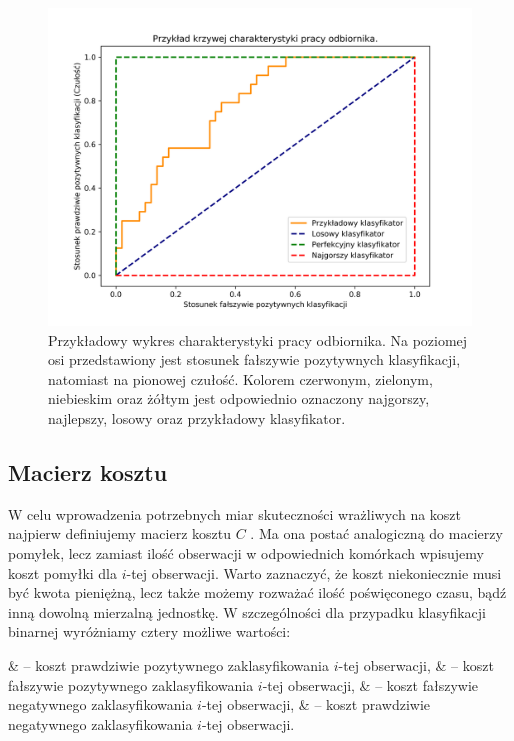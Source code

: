 \documentclass[inzynierska]{pwr_wmat_praca_dyplomowa}
\theoremstyle{plain}
\numberwithin{theorem}{chapter}
\theoremstyle{definition}
\numberwithin{theorem}{chapter}
\begin{document}
\begin{figure}[h]
	\includegraphics[width=\linewidth]{images/roc_example.png}
	\caption{Przykładowy wykres charakterystyki pracy odbiornika. Na poziomej osi przedstawiony jest stosunek fałszywie pozytywnych klasyfikacji, natomiast na pionowej czułość. Kolorem czerwonym, zielonym, niebieskim oraz żółtym jest odpowiednio oznaczony najgorszy, najlepszy, losowy oraz przykładowy klasyfikator.}
	\label{fig:roc_example}
\end{figure}

\subsection{Macierz kosztu}
\label{sec:macierz-kosztu}
W celu wprowadzenia potrzebnych miar skuteczności wrażliwych na koszt najpierw definiujemy macierz kosztu $C$ \cite{CSCCFD, CS-Learning}. Ma ona postać analogiczną do macierzy pomyłek, lecz zamiast ilość obserwacji w odpowiednich komórkach wpisujemy koszt pomyłki dla $i$-tej obserwacji. Warto zaznaczyć, że koszt niekoniecznie musi być kwota pieniężną, lecz także możemy rozważać ilość poświęconego czasu, bądź inną dowolną mierzalną jednostkę. W szczególności dla przypadku klasyfikacji binarnej wyróżniamy cztery możliwe wartości:
\begin{myitemize}
	&  -- koszt prawdziwie pozytywnego zaklasyfikowania $i$-tej obserwacji,
	&  -- koszt fałszywie pozytywnego zaklasyfikowania $i$-tej obserwacji,
	&  -- koszt fałszywie negatywnego zaklasyfikowania $i$-tej obserwacji,
	&  -- koszt prawdziwie negatywnego zaklasyfikowania $i$-tej obserwacji.
\end{myitemize}
\end{document}

